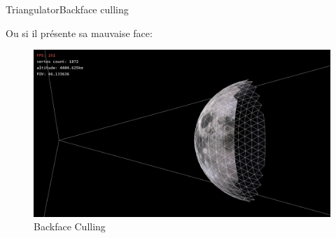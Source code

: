 \documentclass[french]{beamer}
\begin{document}
  \begin{frame}{Triangulator}{Backface culling}
      
 
Ou si il présente sa mauvaise face:

\begin{figure}[H]
  \centerline{
    \includegraphics[scale=0.13]{img/backfaceCulling.jpg}
  }
  \caption{Backface Culling \protect\footnotemark}
  \end{figure}
 \end{frame}
\end{document}
